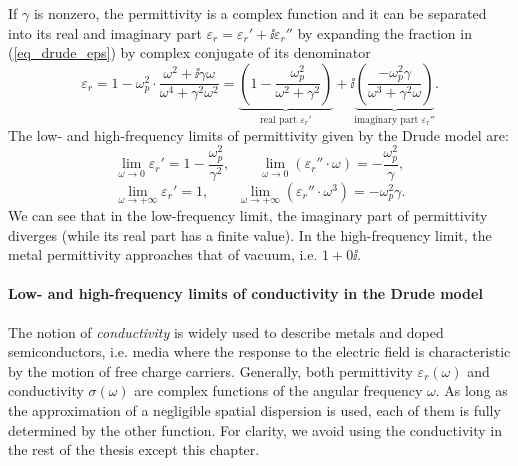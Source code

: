 If $\gamma$ is nonzero, the permittivity is a complex function and it can be separated into its real and imaginary part $\varepsilon_r = \varepsilon_r'+\ii\varepsilon_r''$ by expanding the fraction in (\ref{eq_drude_eps}) by complex conjugate of its denominator
\begin{equation} \varepsilon_r = 1 - \omega_p^{2} \cdot \frac{\omega^{2} + \ii \gamma \omega}{\omega^{4} + \gamma^{2} \omega^{2}} = 
		\underbrace{\left(1 - \frac{\omega_p^2}{\omega^2+\gamma^2}\right) }_{\text{real part } \varepsilon_r'}
+ \ii	\underbrace{\left(\frac{-\omega_p^2\gamma}{\omega^3 + \gamma^2\omega}\right) }_{\text{imaginary part } \varepsilon_r''}.
\label{eq_drude_eps_loss}\end{equation}
The low- and high-frequency limits of permittivity given by the Drude model are:
\begin{equation} \lim_{\omega \to 0} \varepsilon_r' = 1-\frac{\omega_p^2}{\gamma^2}, \quad \quad  
				 \lim_{\omega \to 0} (\varepsilon_r'' \cdot \omega) = -\frac{\omega_p^2}{\gamma},\label{eq_drude_limlow}\end{equation}
\begin{equation} \lim_{\omega \to +\infty} \varepsilon_r' = 1, \quad \quad  
				 \lim_{\omega \to +\infty} (\varepsilon_r'' \cdot \omega^3) = -\omega_p^2 \gamma. \label{eq_drude_limup}\end{equation}
We can see that in the low-frequency limit, the imaginary part of permittivity diverges (while its real part has a finite value). In the high-frequency limit, the metal permittivity approaches that of vacuum, i.e. $1+0\ii$.
\paragraph{Low- and high-frequency limits of conductivity in the Drude model}%
The notion of \textit{conductivity} is widely used to describe metals and doped semiconductors, i.e. media where the response to the electric field is characteristic by the motion of free charge carriers. 
Generally, both permittivity $\varepsilon_r(\omega)$ and conductivity $\sigma(\omega)$ are complex functions of the angular frequency $\omega$. As long as the approximation of a negligible spatial dispersion is used, each of them is fully determined by the other function. %
For clarity, we avoid using the conductivity in the rest of the thesis except this chapter.

